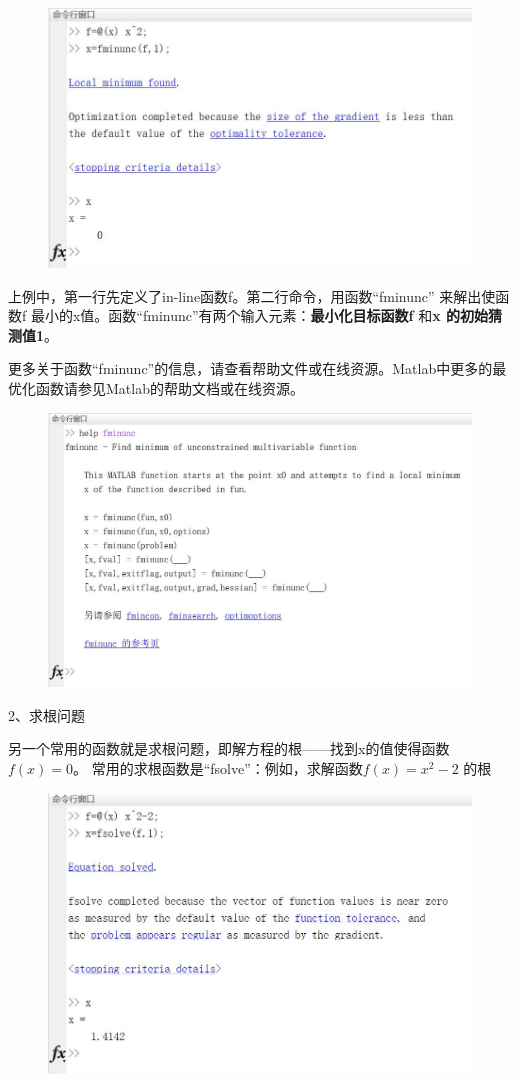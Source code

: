 \documentclass[10pt,math=newtx,citestyle=gb7714-2015,bibstyle=gb7714-2015]{elegantbook}
\begin{document}
{{{	\begin{figure}[htbp!]
		\centering
		\includegraphics[width=0.8\linewidth]{FIG/fminunc}
		\centering
	\end{figure}
	
	上例中，第一行先定义了in-line函数f。第二行命令，用函数“fminunc” 来解出使函数f 最小的x值。函数“fminunc”有两个输入元素：\textbf{最小化目标函数f} 和\textbf{x 的初始猜测值1}。
	
	更多关于函数“fminunc”的信息，请查看帮助文件或在线资源。Matlab中更多的最优化函数请参见Matlab的帮助文档或在线资源。
	
	\begin{figure}[htbp!]
		\centering
		\includegraphics[width=0.8\linewidth]{FIG/helpfminunc}
		\centering
	\end{figure}
	
	2、求根问题
	
	另一个常用的函数就是求根问题，即解方程的根——找到x的值使得函数$f(x)=0$。 常用的求根函数是“fsolve”：例如，求解函数$f(x)=x^2-2$ 的根
	
	\begin{figure}[htbp!]
		\centering
		\includegraphics[width=0.8\linewidth]{FIG/fsolve}
		\centering
	\end{figure}
	
}}}
\end{document}
